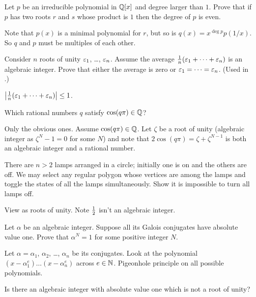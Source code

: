 \begin{problem}
	[Brazil 2006]
	\gim
	Let $p$ be an irreducible polynomial in $\mathbb Q[x]$
	and degree larger than $1$.
	Prove that if $p$ has two roots $r$ and $s$ whose product is $1$
	then the degree of $p$ is even.
	\begin{hint}
		Note that $p(x)$ is a minimal polynomial for $r$,
		but so is $q(x) = x^{\deg p} p(1/x)$.
		So $q$ and $p$ must be multiples of each other.
	\end{hint}
\end{problem}

\begin{sproblem}
	\label{prob:rep_lemma}
	Consider $n$ roots of unity $\varepsilon_1$, \dots, $\varepsilon_n$.
	Assume the average $\frac1n(\varepsilon_1 + \dots + \varepsilon_n)$ is an algebraic integer.
	Prove that either the average is zero or $\varepsilon_1 = \dots = \varepsilon_n$.
	(Used in .)
	\begin{hint}
		$\left\lvert \frac 1n(\varepsilon_1 + \dots + \varepsilon_n) \right\rvert \le 1$.
	\end{hint}
\end{sproblem}

\begin{dproblem}
	Which rational numbers $q$ satisfy $\cos(q\pi) \in \mathbb Q$?
	\begin{hint}
		Only the obvious ones.
		Assume $\cos(q\pi) \in \mathbb Q$.
		Let $\zeta$ be a root of unity (algebraic integer
		as $\zeta^N-1 = 0$ for some $N$)
		and note that $2\cos(q\pi) = \zeta + \zeta^{N-1}$
		is both an algebraic integer and a rational number.
	\end{hint}
\end{dproblem}

\begin{problem}
	[MOP 2010]
	There are $n > 2$ lamps arranged in a circle;
	initially one is on and the others are off.
	We may select any regular polygon whose vertices are among the lamps
	and toggle the states of all the lamps simultaneously.
	Show it is impossible to turn all lamps off.
	\begin{hint}
		View as roots of unity. Note $\frac{1}{2}$ isn't an algebraic integer.
	\end{hint}
\end{problem}

\begin{problem}
	\yod
	Let $\alpha$ be an algebraic integer.
	Suppose all its Galois conjugates have absolute value one.
	Prove that $\alpha^N=1$ for some positive integer $N$.
	\begin{hint}
		Let $\alpha = \alpha_1$, $\alpha_2$, \dots, $\alpha_n$ be its conjugates.
		Look at the polynomial $(x-\alpha_1^e) \dots (x-\alpha_n^e)$ across $e \in \mathbb N$.
		Pigeonhole principle on all possible polynomials.
	\end{hint}
\end{problem}

\begin{problem}
	\yod
	Is there an algebraic integer with absolute value one
	which is not a root of unity?
\end{problem}
